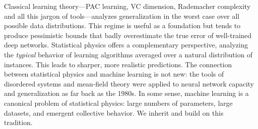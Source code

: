 Classical learning theory---PAC learning, VC dimension, Rademacher complexity and all this jargon of tools---analyzes generalization in the worst case over all possible data
distributions.
This regime is useful as a foundation but tends to produce pessimistic bounds that
badly overestimate the true error of well-trained deep networks.
Statistical physics offers a complementary perspective, analyzing the \emph{typical}
behavior of learning algorithms averaged over a natural distribution of instances.
This leads to sharper, more realistic predictions.
The connection between statistical physics and machine learning is not new: the
tools of disordered systems and mean-field theory were applied to neural network
capacity and generalization as far back as the 1980s.
In some sense, machine learning is a canonical problem of statistical physics: large
numbers of parameters, large datasets, and emergent collective behavior.
We inherit and build on this tradition.
